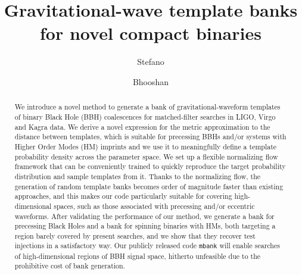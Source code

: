 \documentclass[twocolumn,showpacs,preprintnumbers,nofootinbib,prd,
superscriptaddress,10pt]{revtex4-2}
\begin{document}
\begin{abstract}
	We introduce a novel method to generate a bank of gravitational-waveform templates of binary Black Hole (BBH) coalescences for matched-filter searches in LIGO, Virgo and Kagra data.
	We derive a novel expression for the metric approximation to the distance between templates, which is suitable for precessing BBHs and/or systems with Higher Order Modes (HM) imprints and we use it to meaningfully define a template probability density across the parameter space.
	We set up a flexible normalizing flow framework that can be conveniently trained to quickly reproduce the target probability distribution and sample templates from it. Thanks to the normalizing flow, the generation of random template banks becomes order of magnitude faster than existing approaches, and this makes our code particularly suitable for covering high-dimensional spaces, such as those associated with precessing and/or eccentric waveforms.
	After validating the performance of our method, we generate a bank for precessing Black Holes and a bank for spinning binaries with HMs, both targeting a region barely covered by present searches, and we show that they recover test injections in a satisfactory way.
	Our publicly released code \texttt{mbank} will enable searches of high-dimensional regions of BBH signal space, hitherto unfeasible due to the prohibitive cost of bank generation.
	
\end{abstract}
	
 \title{Gravitational-wave template banks for novel compact binaries}
	\author{Stefano }

	\author{Bhooshan }
        
\end{document}
